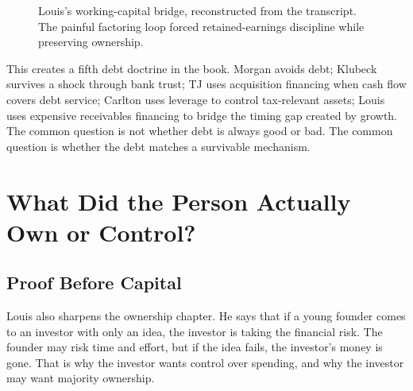 \documentclass[11pt,oneside]{book}
\begin{document}
\begin{figure}
\centering
{}
\caption{Louis's working-capital bridge, reconstructed from the transcript. The painful factoring loop forced retained-earnings discipline while preserving ownership.}
\end{figure}

This creates a fifth debt doctrine in the book. Morgan avoids debt; Klubeck survives a shock through bank trust; TJ uses acquisition financing when cash flow covers debt service; Carlton uses leverage to control tax-relevant assets; Louis uses expensive receivables financing to bridge the timing gap created by growth. The common question is not whether debt is always good or bad. The common question is whether the debt matches a survivable mechanism.

\chapter{What Did the Person Actually Own or Control?}

\section{Proof Before Capital}

Louis also sharpens the ownership chapter. He says that if a young founder comes to an investor with only an idea, the investor is taking the financial risk. The founder may risk time and effort, but if the idea fails, the investor's money is gone. That is why the investor wants control over spending, and why the investor may want majority ownership.
\end{document}
